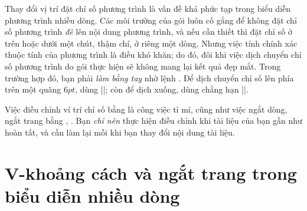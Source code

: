 Thay đổi vị trí đặt chỉ số phương trình là vấn đề khá phức tạp trong
biểu diễn phương trình nhiều dòng. Các môi trường của gói 
luôn cố gắng để không đặt chỉ số phương trình \emph{đè} lên nội dung phương
trình, và nếu cần thiết thì đặt chỉ số ở trên hoặc dưới một chút,
thậm chí, ở riêng một dòng.
Nhưng việc tính chính xác thuộc tính của phương trình là điều khó khăn;
do đó, đôi khi việc dịch chuyển chỉ số phương trình do gói 
thực hiện sẽ không mang lại kết quả đẹp mắt.
Trong trường hợp đó, bạn phải \emph{làm bằng tay} nhờ lệnh .
Để dịch chuyển chỉ số lên phía trên một quãng $6pt$, dùng |\raisetag{6pt}|;
còn để dịch xuống, dùng chẳng hạn |\raisetag{-6pt}|.

\medskip
Việc điều chỉnh ví trí chỉ số bằng  là công việc tỉ mỉ, cũng như việc
ngắt dòng, ngắt trang bằng , . Bạn \emph{chỉ nên}
thực hiện điều chỉnh khi tài liệu của bạn gần như hoàn tất, và cần làm
lại mỗi khi bạn thay đổi nội dung tài liệu.

\section{V-khoảng cách và ngắt trang trong biểu diễn nhiều dòng}

